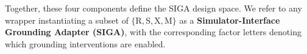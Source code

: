 \documentclass{article}
\begin{document}
Together, these four components define the SIGA design space. 
We refer to any wrapper instantiating a subset of $\{\mathrm{R,S,X,M}\}$ as a \textbf{Simulator-Interface Grounding Adapter (SIGA)}, with the corresponding factor letters denoting which grounding interventions are enabled.





\end{document}
